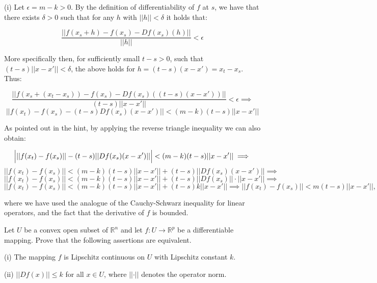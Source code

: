 \begin{solution}
    
    (i) Let $\epsilon = m - k > 0$.
    By the definition of differentiability of $f$ at $s$, we have that there exists $\delta > 0$ such that for any $h$ with $\lvert \lvert h \rvert \rvert < \delta$ it holds that:

    $$\frac{\lvert \lvert f(x_s + h) - f(x_s) - Df(x_s)(h) \rvert \rvert}{\lvert \lvert h \rvert \rvert} < \epsilon$$

    More specifically then, for sufficiently small $t - s > 0$, such that $(t - s)\lvert \lvert x - x' \rvert \rvert < \delta$, the above holds for $h = (t - s) (x - x') = x_t - x_s$.
    Thus:

    $$\frac{\lvert \lvert f(x_s + (x_t - x_s)) - f(x_s) - Df(x_s)((t - s)(x - x'))\rvert \rvert}{(t - s)\lvert \lvert x - x' \rvert \rvert} < \epsilon \implies$$
    $$\lvert \lvert f(x_t) - f(x_s) - (t - s)Df(x_s)(x - x') \rvert \rvert <(m - k)(t - s)\lvert \lvert x - x' \rvert \rvert$$

    As pointed out in the hint, by applying the reverse triangle inequality we can also obtain:

    $$\Bigl \lvert \lvert \lvert f(x_t) - f(x_s) \rvert \rvert - (t - s)\lvert \lvert Df(x_s)(x - x') \rvert \rvert \Bigr \rvert < (m - k)(t - s) \lvert \lvert x - x' \rvert \rvert \implies $$
    $$\lvert \lvert f(x_t) - f(x_s) \rvert \rvert < (m - k)(t - s)\lvert \lvert x - x' \rvert \rvert + (t - s)\lvert \lvert Df(x_s)(x - x') \rvert \rvert \implies$$
    $$\lvert \lvert f(x_t) - f(x_s) \rvert \rvert < (m - k)(t - s) \lvert \lvert x - x' \rvert \rvert + (t - s)\lvert \lvert Df(x_s) \rvert \rvert \cdot \lvert \lvert x - x' \rvert \rvert \implies $$
    $$\lvert \lvert f(x_t) - f(x_s) \rvert \rvert < (m - k)(t - s)\lvert \lvert x - x' \rvert \rvert + (t -s)k \lvert \lvert x - x' \rvert \rvert \implies \lvert \lvert f(x_t) - f(x_s) \rvert \rvert < m(t -s)\lvert \lvert x - x' \rvert \rvert,$$

    where we have used the analogue of the Cauchy-Schwarz inequality for linear operators, and the fact that the derivative of $f$ is bounded.

\end{solution}

\begin{exercise}{24}
    Let $U$ be a convex open subset of $\mathbb{R}^n$ and let $f: U \rightarrow \mathbb{R}^p$ be a differentiable mapping.
    Prove that the following assertions are equivalent.

    (i) The mapping $f$ is Lipschitz continuous on $U$ with Lipschitz constant $k$.

    (ii) $\lvert \lvert D f(x) \rvert \rvert \leq k$ for all $x \in U$, where $\lvert \lvert \cdot \rvert \rvert$ denotes the operator norm.
\end{exercise}

